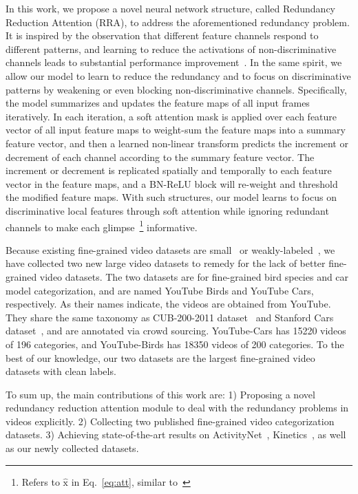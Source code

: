 \documentclass[runningheads]{llncs}
\def\x{\boldsymbol{\mathrm{x}}}
\begin{document}
In this work, we propose a novel neural network structure, called Redundancy Reduction Attention (RRA), to address the aforementioned redundancy problem. It is inspired by the observation that different feature channels respond to different patterns, and learning to reduce the activations of non-discriminative channels leads to substantial performance improvement~\cite{hu2017squeeze,Zheng_2017_ICCV}. In the same spirit, we allow our model to learn to reduce the redundancy and to focus on discriminative patterns by weakening or even blocking non-discriminative channels. Specifically, the model summarizes and updates the feature maps of all input frames iteratively. In each iteration, a soft attention mask is applied over each feature vector of all input feature maps to weight-sum the feature maps into a summary feature vector, and then a learned non-linear transform predicts the increment or decrement of each channel according to the summary feature vector. The increment or decrement is replicated spatially and temporally to each feature vector in the feature maps, and a BN-ReLU block will re-weight and threshold the modified feature maps. With such structures, our model learns to focus on discriminative local features through soft attention while ignoring redundant channels to make each glimpse~\footnote{Refers to $\hat{\x}$ in Eq.~\ref{eq:att}, similar to~\cite{larochelle2010learning}} informative.

Because existing fine-grained video datasets are small~\cite{saito2016ibc127} or weakly-labeled~\cite{karpathy2014large}, we have collected two new large video datasets to remedy for the lack of better fine-grained video datasets. The two datasets are for fine-grained bird species and car model categorization, and are named YouTube Birds and YouTube Cars, respectively. As their names indicate, the videos are obtained from YouTube. They share the same taxonomy as CUB-200-2011 dataset~\cite{WahCUB_200_2011} and Stanford Cars dataset~\cite{krause20133d}, and are annotated via crowd sourcing. YouTube-Cars has 15220 videos of 196 categories, and YouTube-Birds has 18350 videos of 200 categories. To the best of our knowledge, our two datasets are the largest fine-grained video datasets with clean labels.

To sum up, the main contributions of this work are: 1) Proposing a novel redundancy reduction attention module to deal with the redundancy problems in videos explicitly. 2) Collecting two published fine-grained video categorization datasets.  3) Achieving state-of-the-art results on ActivityNet~\cite{caba2015activitynet}, Kinetics~\cite{kay2017kinetics}, as well as our newly collected datasets.
\end{document}
